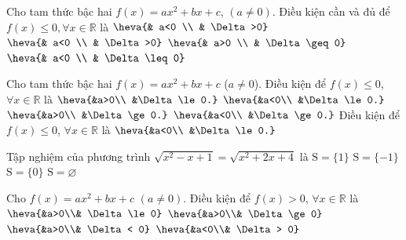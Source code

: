\begin{ex}%
Cho tam thức bậc hai $f(x)=ax^2+bx+c$, $(a \neq 0)$. Điều kiện cần và đủ để $f(x) \le 0, \forall x \in \mathbb{R}$ là
\choice
{$\heva{& a<0 \\ & \Delta>0}$}
{$\heva{& a<0 \\ & \Delta>0}$}
{$\heva{& a>0 \\ & \Delta \geq 0}$}
{\True $\heva{& a<0 \\ & \Delta \leq 0}$}
\end{ex}

\begin{ex}%
Cho tam thức bậc hai $f(x)= ax^2+bx+c$ ($a\neq 0$). Điều kiện để $f(x) \le 0$, $\forall x\in \mathbb{R}$ là
\def\dotEX{}
\choice
{$\heva{&a>0\\ &\Delta\le 0.}$}
{\True $\heva{&a<0\\ &\Delta \le 0.}$}
{$\heva{&a>0\\ &\Delta\ge 0.}$}
{$\heva{&a<0\\ &\Delta\ge 0.}$}
\loigiai
{
Điều kiện để $f(x) \le 0$, $\forall x\in \mathbb{R}$ là $\heva{&a<0\\ &\Delta \le 0.}$
}
\end{ex}

\begin{ex}%
Tập nghiệm của phương trình
$\sqrt{x^2-x+1}=\sqrt{x^2+2x+4}$ là
\choice
{ $\mathrm{S} = \{1\}$}
{\True$\mathrm{S} = \{-1\}$}
{$\mathrm{S} = \{0\}$}
{$\mathrm{S} = \varnothing$}
\end{ex}

\begin{ex}%
Cho $f(x)=a x^2+b x+c$ $(a \ne 0)$. Điều kiện để $f(x)>0$, $\forall x \in \mathbb{R}$ là
\choice
{$\heva{&a>0\\& \Delta \le 0}$}
{$\heva{&a>0\\& \Delta \ge 0}$}
{\True $\heva{&a>0\\& \Delta < 0}$}
{$\heva{&a<0\\& \Delta > 0}$}
\end{ex}

